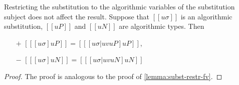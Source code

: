 \begin{lemma}
  \label{lemma:subst-restr-uv}
  Restricting the substitution to the algorithmic 
  variables of the
  substitution subject does not affect the result.
  Suppose that $[[uσ]]$ is an algorithmic substitution,
  $[[uP]]$ and $[[uN]]$ are algorithmic types. Then
 \begin{itemize}
    \item[$+$] $[[ [uσ]uP ]] = [[ [uσ|uv uP]uP ]]$,
    \item[$-$] $[[ [uσ]uN ]] = [[ [uσ|uv uN]uN ]]$
  \end{itemize}
\end{lemma}
\begin{proof}
  The proof is analogous to the proof of \cref{lemma:subst-restr-fv}.
\end{proof}

